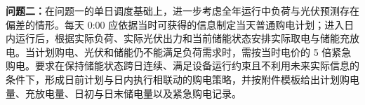 \textbf{问题二：}在问题一的单日调度基础上，进一步考虑全年运行中负荷与光伏预测存在偏差的情形。每天 0:00 应依据当时可获得的信息制定当天普通购电计划；进入日内运行后，根据实际负荷、实际光伏出力和当前储能状态安排实际取电与储能充放电。当计划购电、光伏和储能仍不能满足负荷需求时，需按当时电价的 5 倍紧急购电。要求在保持储能状态跨日连续、满足设备运行约束且不利用未来实际信息的条件下，形成日前计划与日内执行相联动的购电策略，并按附件模板给出计划购电量、充放电量、日初与日末储电量以及紧急购电记录。
